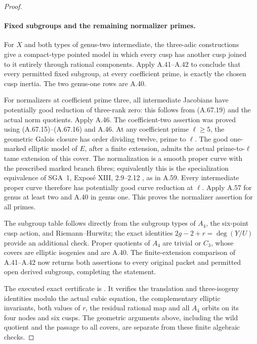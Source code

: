 \begin{proof}
\paragraph{Fixed subgroups and the remaining normalizer primes.}
For \(X\) and both types of genus-two intermediate, the
three-adic constructions give a compact-type pointed model
in which every cusp has another cusp joined to it entirely
through rational components. Apply A.41--A.42 to conclude
that every permitted fixed subgroup, at every coefficient
prime, is exactly the chosen cusp inertia. The two
genus-one rows are A.40.

For normalizers at coefficient prime three, all intermediate
Jacobians have potentially good reduction of three-rank zero:
this follows from (A.67.19) and the actual norm quotients.
Apply A.46. The coefficient-two assertion was proved using
(A.67.15)--(A.67.16) and A.46. At any coefficient prime
\(\ell\ge5\), the geometric Galois closure has order dividing
twelve, prime to \(\ell\). The good one-marked elliptic model
of \(E\), after a finite extension, admits the actual
prime-to-\(\ell\) tame extension of this cover. The
normalization is a smooth proper curve with the prescribed
marked branch fibres; equivalently this is the specialization
equivalence of SGA~1, Expos\'e XIII, 2.9--2.12
\cite{fghSGA1}, as in A.59. Every intermediate proper curve
therefore has potentially good curve reduction at \(\ell\).
Apply A.57 for genus at least two and A.40 in genus one.
This proves the normalizer assertion for all primes.

The subgroup table follows directly from the subgroup types
of \(A_4\), the six-point cusp action, and Riemann--Hurwitz;
the exact identities \(2g-2+r=\deg(Y/U)\) provide an
additional check. Proper quotients of \(A_4\) are trivial or
\(C_3\), whose covers are elliptic isogenies and are A.40.
The finite-extension comparison of A.41--A.42 now returns
both assertions to every original packet and permitted
open derived subgroup, completing the statement.

The executed exact certificate is
. It verifies the translation
and three-isogeny identities modulo the actual cubic equation,
the complementary elliptic invariants, both values of \(r\),
the residual rational map and all \(A_4\) orbits on its four
nodes and six cusps. The geometric arguments above, including
the wild quotient and the passage to all covers, are separate
from these finite algebraic checks.
\end{proof}
